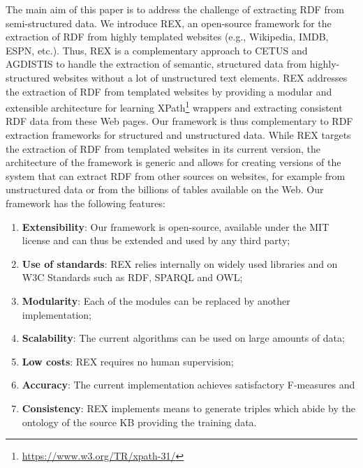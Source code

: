The main aim of this paper is to address the challenge of extracting \ac{RDF} from semi-structured data.
We introduce REX, an open-source framework for the extraction of \ac{RDF} from highly templated websites (e.g., Wikipedia, IMDB, ESPN, etc.).
Thus, REX is a complementary approach to CETUS and AGDISTIS to handle the extraction of semantic, structured data  from highly-structured websites without a lot of unstructured text elements.
REX addresses the extraction of \ac{RDF} from templated websites by providing a modular and extensible architecture for learning XPath\footnote{\url{https://www.w3.org/TR/xpath-31/}} wrappers and extracting consistent \ac{RDF} data from these Web pages.
Our framework is thus complementary to \ac{RDF} extraction frameworks for structured and unstructured data.
While REX targets the extraction of \ac{RDF} from templated websites in its current version, the architecture of the framework is generic and allows for creating versions of the system that can extract \ac{RDF} from other sources on websites, for example from unstructured data or from the billions of tables available on the Web.
Our framework has the following features:
\begin{enumerate}
\item \textbf{Extensibility}: Our framework is open-source, available under the MIT license and can thus be extended and used by any third party;
\item \textbf{Use of standards}: REX relies internally on widely used libraries and on W3C Standards such as \ac{RDF}, SPARQL and OWL;
\item \textbf{Modularity}: Each of the modules can be replaced by another implementation;
\item \textbf{Scalability}: The current algorithms can be used on large amounts of data; 
\item \textbf{Low costs}: REX requires no human supervision; 
\item \textbf{Accuracy}: The current implementation achieves satisfactory F-measures and
\item \textbf{Consistency}: REX implements means to generate triples which abide by the ontology of the source  \ac{KB} providing the training data.
\end{enumerate}

